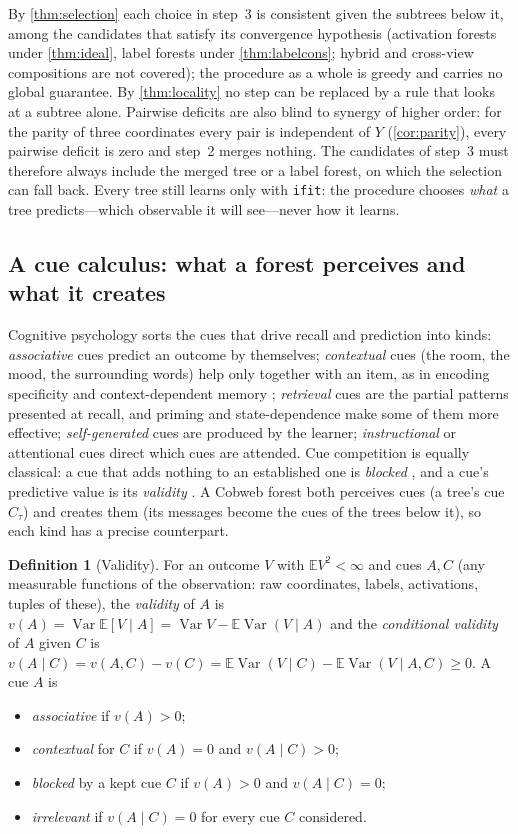 \documentclass[11pt]{article}
\theoremstyle{definition}
\newtheorem{definition}[theorem]{Definition}
\theoremstyle{remark}
\newcommand{\E}{\mathbb{E}}
\newcommand{\Var}{\operatorname{Var}}
\begin{document}
By \cref{thm:selection} each choice in step~3 is consistent given the subtrees below it,
among the candidates that satisfy its convergence hypothesis (activation forests under
\cref{thm:ideal}, label forests under \cref{thm:labelcons}; hybrid and cross-view
compositions are not covered);
the procedure as a whole is greedy and carries no global guarantee.  By
\cref{thm:locality} no step can be replaced by a rule that looks at a subtree alone.
Pairwise deficits are also blind to synergy of higher order: for the parity of three
coordinates every pair is independent of $Y$ (\cref{cor:parity}), every pairwise deficit
is zero and step~2 merges nothing.  The candidates of step~3 must therefore always
include the merged tree or a label forest, on which the selection can fall back.
Every tree still learns only with \texttt{ifit}: the procedure chooses \emph{what} a tree
predicts---which observable it will see---never how it learns.

\subsection{A cue calculus: what a forest perceives and what it creates}\label{sec:cues}

Cognitive psychology sorts the cues that drive recall and prediction into kinds:
\emph{associative} cues predict an outcome by themselves; \emph{contextual} cues (the room,
the mood, the surrounding words) help only together with an item, as in encoding
specificity \citep{tulving1973} and context-dependent memory \citep{godden1975};
\emph{retrieval} cues are the partial patterns presented at recall, and priming and
state-dependence make some of them more effective; \emph{self-generated} cues are produced by
the learner; \emph{instructional} or attentional cues direct which cues are attended.  Cue
competition is equally classical: a cue that adds nothing to an established one is
\emph{blocked} \citep{kamin1969,rescorla1972}, and a cue's predictive value is its
\emph{validity} \citep{brunswik1956}.  A Cobweb forest both perceives cues (a tree's cue
$C_\tau$) and creates them (its messages become the cues of the trees below it), so each
kind has a precise counterpart.

\begin{definition}[Validity]\label{def:validity}
For an outcome $V$ with $\E V^2<\infty$ and cues $A,C$ (any measurable functions of the
observation: raw coordinates, labels, activations, tuples of these), the \emph{validity}
of $A$ is $v(A)=\Var\E[V\mid A]=\Var V-\E\Var(V\mid A)$ and the \emph{conditional validity}
of $A$ given $C$ is $v(A\mid C)=v(A,C)-v(C)=\E\Var(V\mid C)-\E\Var(V\mid A,C)\ge0$.
A cue $A$ is
\begin{itemize}[leftmargin=*,noitemsep]
\item \emph{associative} if $v(A)>0$;
\item \emph{contextual} for $C$ if $v(A)=0$ and $v(A\mid C)>0$;
\item \emph{blocked} by a kept cue $C$ if $v(A)>0$ and $v(A\mid C)=0$;
\item \emph{irrelevant} if $v(A\mid C)=0$ for every cue $C$ considered.
\end{itemize}
\end{definition}
\end{document}
